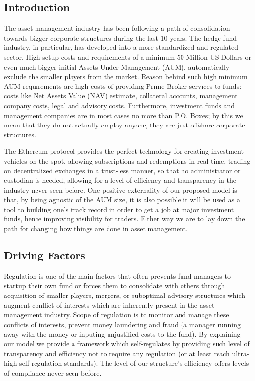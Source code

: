 \documentclass[9pt,oneside]{amsart}
\begin{document}
\setlength{\columnsep}{20pt}
\begin{multicols}{2}

\section{Introduction}\label{sec:introduction}

The asset management industry has been following a path of consolidation towards bigger corporate structures during the last 10 years. The hedge fund industry, in particular, has developed into a more standardized and regulated sector. High setup costs and requirements of a minimum 50 Million US Dollars or even much bigger initial Assets Under Management (AUM), automatically exclude the smaller players from the market. Reason behind such high minimum AUM requirements are high costs of providing Prime Broker services to funds: costs like Net Assets Value (NAV) estimate, collateral accounts, management company costs, legal and advisory costs. Furthermore, investment funds and management companies are in most cases no more than P.O. Boxes; by this we mean that they do not actually employ anyone, they are just offshore corporate structures.

The Ethereum protocol provides the perfect technology for creating investment vehicles on the spot, allowing subscriptions and redemptions in real time, trading on decentralized exchanges in a trust-less manner, so that no administrator or custodian is needed, allowing for a level of efficiency and transparency in the industry never seen before. One positive externality of our proposed model is that, by being agnostic of the AUM size, it is also possible it will be used as a tool to building one's track record in order to get a job at major investment funds, hence improving visibility for traders. Either way we are to lay down the path for changing how things are done in asset management.

\subsection{Driving Factors} \label{ch:driving}

Regulation is one of the main factors that often prevents fund managers to startup their own fund or forces them to consolidate with others through acquisition of smaller players, mergers, or suboptimal advisory structures which augment conflict of interests which are inherently present in the asset management industry. Scope of regulation is to monitor and manage these conflicts of interests, prevent money laundering and fraud (a manager running away with the money or inputing unjustified costs to the fund). By explaining our model we provide a framework which self-regulates by providing such level of transparency and efficiency not to require any regulation (or at least reach ultra-high self-regulation standards). The level of our structure's efficiency offers levels of compliance never seen before.


\end{multicols}
\end{document}
